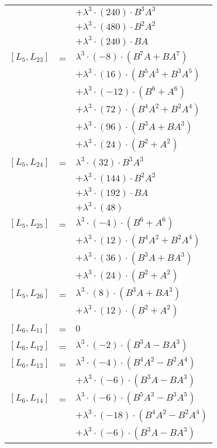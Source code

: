 \documentclass{article}
\begin{document}
\begin{center}
\begin{longtable}{lll}
 & & $ + {\lambda}^3{\cdot}(240){\cdot}B^{3}A^{3}$ \\*
 & & $ + {\lambda}^3{\cdot}(480){\cdot}B^{2}A^{2}$ \\*
 & & $ + {\lambda}^3{\cdot}(240){\cdot}BA$ \\
$[L_{5},L_{23}]$ & = & ${\lambda}^3{\cdot}(-8){\cdot}(B^{7}A+BA^{7})$ \\*
 & & $ + {\lambda}^3{\cdot}(16){\cdot}(B^{5}A^{3}+B^{3}A^{5})$ \\*
 & & $ + {\lambda}^3{\cdot}(-12){\cdot}(B^{6}+A^{6})$ \\*
 & & $ + {\lambda}^3{\cdot}(72){\cdot}(B^{4}A^{2}+B^{2}A^{4})$ \\*
 & & $ + {\lambda}^3{\cdot}(96){\cdot}(B^{3}A+BA^{3})$ \\*
 & & $ + {\lambda}^3{\cdot}(24){\cdot}(B^{2}+A^{2})$ \\
$[L_{5},L_{24}]$ & = & ${\lambda}^3{\cdot}(32){\cdot}B^{3}A^{3}$ \\*
 & & $ + {\lambda}^3{\cdot}(144){\cdot}B^{2}A^{2}$ \\*
 & & $ + {\lambda}^3{\cdot}(192){\cdot}BA$ \\*
 & & $ + {\lambda}^3{\cdot}(48)$ \\
$[L_{5},L_{25}]$ & = & ${\lambda}^3{\cdot}(-4){\cdot}(B^{6}+A^{6})$ \\*
 & & $ + {\lambda}^3{\cdot}(12){\cdot}(B^{4}A^{2}+B^{2}A^{4})$ \\*
 & & $ + {\lambda}^3{\cdot}(36){\cdot}(B^{3}A+BA^{3})$ \\*
 & & $ + {\lambda}^3{\cdot}(24){\cdot}(B^{2}+A^{2})$ \\
$[L_{5},L_{26}]$ & = & ${\lambda}^3{\cdot}(8){\cdot}(B^{3}A+BA^{3})$ \\*
 & & $ + {\lambda}^3{\cdot}(12){\cdot}(B^{2}+A^{2})$ \\
$[L_{6},L_{11}]$ & = & $ 0 $ \\
$[L_{6},L_{12}]$ & = & ${\lambda}^3{\cdot}(-2){\cdot}(B^{3}A-BA^{3})$ \\
$[L_{6},L_{13}]$ & = & ${\lambda}^3{\cdot}(-4){\cdot}(B^{4}A^{2}-B^{2}A^{4})$ \\*
 & & $ + {\lambda}^3{\cdot}(-6){\cdot}(B^{3}A-BA^{3})$ \\
$[L_{6},L_{14}]$ & = & ${\lambda}^3{\cdot}(-6){\cdot}(B^{5}A^{3}-B^{3}A^{5})$ \\*
 & & $ + {\lambda}^3{\cdot}(-18){\cdot}(B^{4}A^{2}-B^{2}A^{4})$ \\*
 & & $ + {\lambda}^3{\cdot}(-6){\cdot}(B^{3}A-BA^{3})$ \\

\end{longtable}
\end{center}
\end{document}
